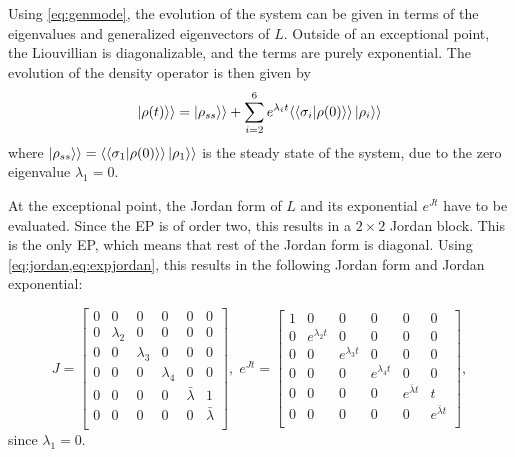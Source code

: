 \documentclass[../main.tex]{subfiles}
\begin{document}
Using \cref{eq:genmode}, the evolution of the system can be given in terms of the eigenvalues and generalized eigenvectors of $L$. Outside of an exceptional point, the Liouvillian is diagonalizable, and the terms are purely exponential. The evolution of the density operator is then given by
\begin{equation}\label{eq:dynnonep}
    \ket{\rho(t)}\rangle = \ket{\rho_{ss}}\rangle + \sum_{i=2}^6 e^{\lambda_i t} \langle\braket{\sigma_i|\rho(0)}\rangle \ket{\rho_i}\rangle
\end{equation}
where $\ket{\rho_{ss}}\rangle = \langle\braket{\sigma_1|\rho(0)}\rangle \ket{\rho_1}\rangle$ is the steady state of the system, due to the zero eigenvalue $\lambda_1=0$.

At the exceptional point, the Jordan form of $L$ and its exponential $e^{Jt}$ have to be evaluated. Since the EP is of order two, this results in a $2\times2$ Jordan block. This is the only EP, which means that rest of the Jordan form is diagonal. Using \cref{eq:jordan,eq:expjordan}, this results in the following Jordan form and Jordan exponential:

\begin{equation}
    J = \begin{bmatrix} 0 & 0 & 0 & 0 & 0 & 0 \\
                        0 & \lambda_2 & 0 & 0 & 0 & 0 \\
                        0 & 0 & \lambda_3 & 0 & 0 & 0 \\
                        0 & 0 & 0 & \lambda_4 & 0 & 0 \\
                        0 & 0 & 0 & 0 & \bar \lambda & 1 \\
                        0 & 0 & 0 & 0 & 0 & \bar \lambda \\ \end{bmatrix}, \; 
        e^{Jt} = \begin{bmatrix} 1 & 0 & 0 & 0 & 0 & 0 \\
            0 & e^{\lambda_2t} & 0 & 0 & 0 & 0 \\
            0 & 0 & e^{\lambda_3t} & 0 & 0 & 0 \\
            0 & 0 & 0 & e^{\lambda_4t} & 0 & 0 \\
            0 & 0 & 0 & 0 & e^{\bar \lambda t} & t \\
        0 & 0 & 0 & 0 & 0 & e^{\bar \lambda t} \\ \end{bmatrix},
\end{equation}
since $\lambda_1 = 0$.
\end{document}
